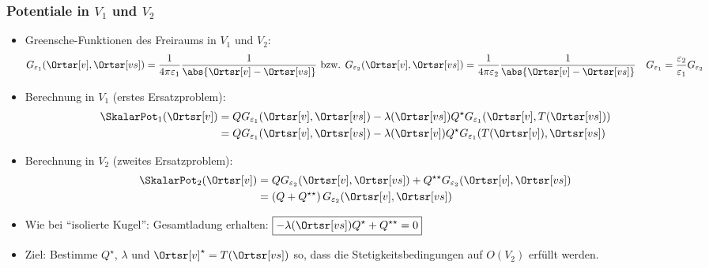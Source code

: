   \begin{frame}
    \frametitle{Potentiale in $V_1$ und $V_2$}
    \begin{itemize}[<+->]
    \item Greensche-Funktionen des Freiraums in $V_1$ und $V_2$:
      \begin{equation*}
        G_{\varepsilon_1}(\Ortsr[v], \Ortsr[vs]) = \frac{1}{4\pi\varepsilon_1} \frac{1}{\abs{\Ortsr[v] - \Ortsr[vs]}} \text{ bzw. }         G_{\varepsilon_2}(\Ortsr[v], \Ortsr[vs]) = \frac{1}{4\pi\varepsilon_2} \frac{1}{\abs{\Ortsr[v] - \Ortsr[vs]}} \quad G_{\varepsilon_1}= \frac{\varepsilon_2}{\varepsilon_1} G_{\varepsilon_2}  
      \end{equation*}
    \item Berechnung in $V_1$ (erstes Ersatzproblem):
      \begin{align*}
        \SkalarPot_1(\Ortsr[v]) & = Q G_{\varepsilon_1}(\Ortsr[v], \Ortsr[vs]) -  \lambda(\Ortsr[vs])Q^\star G_{\varepsilon_1}(\Ortsr[v], T(\Ortsr[vs]))\\
        & = Q G_{\varepsilon_1}(\Ortsr[v], \Ortsr[vs]) - \lambda(\Ortsr[v]) Q^\star G_{\varepsilon_1}(T(\Ortsr[v]), \Ortsr[vs])
        \end{align*}
    \item Berechnung in $V_2$ (zweites Ersatzproblem):
      \begin{align*}
        \SkalarPot_2(\Ortsr[v]) & = Q G_{\varepsilon_2}(\Ortsr[v], \Ortsr[vs]) +  Q^{\star\star} G_{\varepsilon_2}(\Ortsr[v], \Ortsr[vs])\\
                                       & = \left( Q +  Q^{\star\star}\right) G_{\varepsilon_2}(\Ortsr[v], \Ortsr[vs])
      \end{align*}
      \item Wie bei \enquote{isolierte Kugel}: Gesamtladung erhalten: $\boxed{-\lambda(\Ortsr[vs])Q^\star+Q^{\star\star}= 0}$
      \item Ziel: Bestimme $Q^\star$, $\lambda$ und $\Ortsr[v]^\star=T(\Ortsr[vs])$ so, dass die Stetigkeitsbedingungen auf $O(V_2)$ erfüllt werden. 
      \end{itemize}
    \end{frame}

